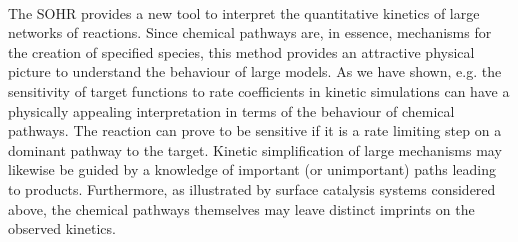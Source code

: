 \paragraph{}
The SOHR provides a new tool to interpret the quantitative kinetics of large networks
of reactions. Since chemical pathways are, in essence, mechanisms for the creation
of specified species, this method provides an attractive physical picture to
understand the behaviour of large models. As we have shown, e.g. the sensitivity of
target functions to rate coefficients in kinetic simulations can have a physically appealing
interpretation in terms of the behaviour of chemical pathways. The reaction can
prove to be sensitive if it is a rate limiting step on a dominant pathway to the target.
Kinetic simplification\cite{ch1_IRPC_67_skodje2001geometrical,ch1_IRPC_68_law2003development,ch1_IRPC_69_maas1992simplifying} of large mechanisms may likewise be guided by a
knowledge of important (or unimportant) paths leading to products. Furthermore, as
illustrated by surface catalysis systems considered above, the chemical pathways themselves
may leave distinct imprints on the observed kinetics.
\newline
